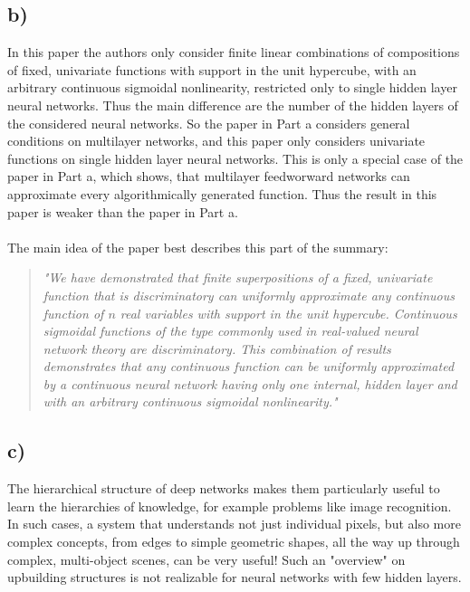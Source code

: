 \documentclass[a4paper]{article}
\begin{document}
    \subsection*{b)}
    In this paper the authors only consider finite linear combinations of compositions of fixed, univariate functions with support in the unit hypercube, with an arbitrary continuous sigmoidal nonlinearity, restricted only to single hidden layer neural networks.
    Thus the main difference are the number of the hidden layers of the considered neural networks.
    So the paper in Part a considers general conditions on multilayer networks, and this paper only considers univariate functions on single hidden layer neural networks.
    This is only a special case of the paper in Part a, which shows, that multilayer feedworward networks can approximate every algorithmically generated function.
    Thus the result in this paper is weaker than the paper in Part a.\\\\
    The main idea of the paper best describes this part of the summary:
    \begin{quote}
        \textit{"We have demonstrated that finite superpositions of a fixed, univariate function that is discriminatory can uniformly approximate any continuous function of $n$ real variables with support in the unit hypercube. Continuous sigmoidal functions of the type commonly used in real-valued neural network theory are discriminatory.
        This combination of results demonstrates that any continuous function can be uniformly approximated by a continuous neural network having only one internal, hidden layer and with an arbitrary continuous sigmoidal nonlinearity."}
    \end{quote}
    
    \subsection*{c)}
        The hierarchical structure of deep networks makes them particularly useful to learn the hierarchies of knowledge, for example problems like image recognition. 
        In such cases, a system that understands not just individual pixels, but also more complex concepts, from edges to simple geometric shapes, all the way up through complex, multi-object scenes, can be very useful!
        Such an "overview" on upbuilding structures is not realizable for neural networks with few hidden layers.
\end{document}
